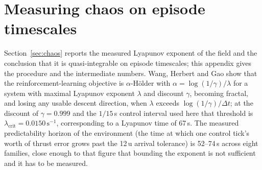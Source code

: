 \section{Measuring chaos on episode timescales}
\label{app:chaos}

Section~\ref{sec:chaos} reports the measured Lyapunov exponent of the field
and the conclusion that it is quasi-integrable on episode timescales; this
appendix gives the procedure and the intermediate numbers. Wang, Herbert and Gao \cite{wang2023} show that the
reinforcement-learning objective is $\alpha$-H\"older with
$\alpha = \log(1/\gamma)/\lambda$ for a system with maximal Lyapunov
exponent $\lambda$ and discount $\gamma$, becoming fractal, and losing any
usable descent direction, when $\lambda$ exceeds $\log(1/\gamma)/\Delta t$;
at the discount of $\gamma = 0.999$ and the $1/15$\,s control interval used
here that threshold is $\lambda_{\mathrm{crit}} = 0.0150\,\mathrm{s}^{-1}$,
corresponding to a Lyapunov time of 67\,s. The measured predictability
horizon of the environment (the time at which one control tick's worth of
thrust error grows past the 12\,u arrival tolerance) is 52--74\,s across
eight families, close enough to that figure that bounding the exponent is
not sufficient and it has to be measured.

